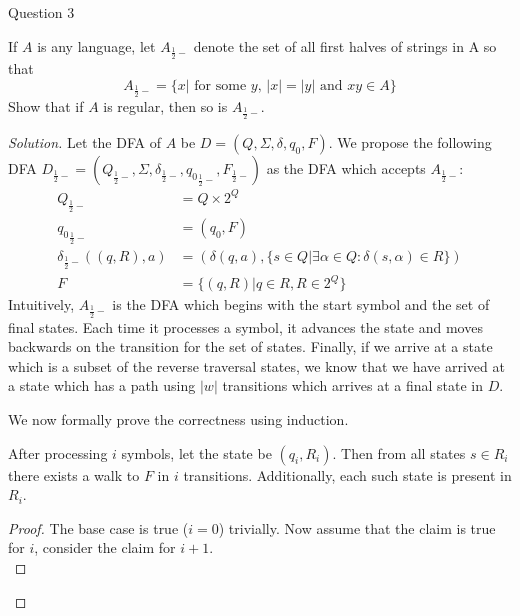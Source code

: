 \begin{solution}{Question 3}\label{ques:3}
    \begin{question}
    If $A$ is any language, let $A_{\frac{1}{2} -}$ denote the set of all first halves of strings in A so that
    \begin{equation}
        A_{\frac{1}{2} -} = \{x | \text{ for some $y$, }|x| = |y| \text{ and } xy \in A\}
    \end{equation}
    Show that if $A$ is regular, then so is $A_{\frac{1}{2} -}$.
    \end{question}
    \tcblower{}
    \begin{proof}[Solution]
      Let the DFA of $A$ be $D = (Q, \Sigma, \delta, q_0, F)$. We propose the following DFA $D_{\frac{1}{2}-} = (Q_{\frac{1}{2}-}, \Sigma, \delta_{\frac{1}{2}-}, {q_0}_{\frac{1}{2}-}, F_{\frac{1}{2}-})$ as the DFA which accepts $A_{\frac{1}{2}-}$:
      \begin{equation}
        \begin{split}
          Q_{\frac{1}{2}-} &= Q \times 2^Q\\
          {q_0}_{\frac{1}{2}-} &= (q_0, F)\\
          \delta_{\frac{1}{2}-}((q, R), a) &= (\delta(q, a), \{s \in Q | \exists\alpha\in Q: \delta(s, \alpha) \in R\})\\
          F &= \{(q, R) | q\in R, R\in 2^Q\}
        \end{split}
      \end{equation}
      Intuitively, $A_{\frac{1}{2}-}$ is the DFA which begins with the start symbol and the set of final states. Each time it processes a symbol, it advances the state and moves backwards on the transition for the set of states. Finally, if we arrive at a state which is a subset of the reverse traversal states, we know that we have arrived at a state which has a path using $|w|$ transitions which arrives at a final state in $D$.\par
      We now formally prove the correctness using induction.
      \begin{claim}
        After processing $i$ symbols, let the state be $(q_i, R_i)$. Then from all states $s\in R_i$ there exists a walk to $F$ in $i$ transitions. Additionally, each such state is present in $R_i$.
      \end{claim}
      \begin{proof}
        The base case is true ($i=0$) trivially. Now assume that the claim is true for $i$, consider the claim for $i+1$.\\

\end{proof}
\end{proof}
\end{solution}
